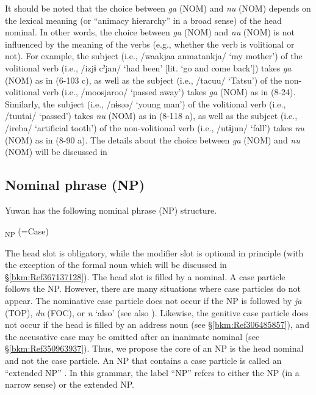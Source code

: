 It should be noted that the choice between \textit{ga} (NOM) and \textit{nu} (NOM) depends on the lexical meaning (or “animacy hierarchy” in a broad sense) of the head nominal. In other words, the choice between \textit{ga} (NOM) and \textit{nu} (NOM) is not influenced by the meaning of the verbs (e.g., whether the verb is volitional or not). For example, the subject (i.e., /waakjaa anmatankja/ ‘my mother’) of the volitional verb (i.e., /izjɨ cˀjan/ ‘had been’ [lit. ‘go and come back’]) takes \textit{ga} (NOM) as in (6-103 c), as well as the subject (i.e., /tacuu/ ‘Tatsu’) of the non-volitional verb (i.e., /moosjaroo/ ‘passed away’) takes \textit{ga} (NOM) as in (8-24). Similarly, the subject (i.e., /nɨsəə/ ‘young man’) of the volitional verb (i.e., /tuutai/ ‘passed’) takes \textit{nu} (NOM) as in (8-118 a), as well as the subject (i.e., /ireba/ ‘artificial tooth’) of the non-volitional verb (i.e., /utɨjun/ ‘fall’) takes \textit{nu} (NOM) as in (8-90 a). The details about the choice between \textit{ga} (NOM) and \textit{nu} (NOM) will be discussed in 

\subsection{Nominal phrase (NP)}
\hypertarget{RefHeadingToc395696993}{}\label{bkm:Ref306571490}
Yuwan has the following nominal phrase (NP) structure.

\ea{}\textsubscript{NP}\textit{\textsubscript{} }(=Case) \z

The head slot is obligatory, while the modifier slot is optional in principle (with the exception of the formal noun which will be discussed in §\ref{bkm:Ref367137128}). The head slot is filled by a nominal. A case particle follows the NP. However, there are many situations where case particles do not appear. The nominative case particle does not occur if the NP is followed by \textit{ja} (TOP), \textit{du} (FOC), or \textit{n} ‘also’ (see also ). Likewise, the genitive case particle does not occur if the head is filled by an address noun (see §\ref{bkm:Ref306485857}), and the accusative case may be omitted after an inanimate nominal (see §\ref{bkm:Ref350963937}). Thus, we propose the core of an NP is the head nominal and not the case particle. An NP that contains a case particle is called an “extended NP” \citep[167]{Shimoji2008}. In this grammar, the label “NP” refers to either the NP (in a narrow sense) or the extended NP.

